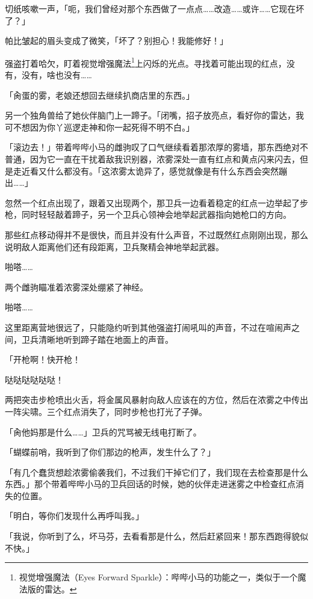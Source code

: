 切纸咳嗽一声，「呃，我们曾经对那个东西做了一点点……改造……或许……它现在坏了？」

帕比皱起的眉头变成了微笑，「坏了？别担心！我能修好！」

\horizonline


强盗打着哈欠，盯着视觉增强魔法\footnote{视觉增强魔法（Eyes Forward Sparkle）：哔哔小马的功能之一，类似于一个魔法版的雷达。}上闪烁的光点。寻找着可能出现的红点，没有，没有，啥也没有……

「肏蛋的雾，老娘还想回去继续扒商店里的东西。」

另一个独角兽给了她伙伴脑门上一蹄子。「闭嘴，招子放亮点，看好你的雷达，我可不想因为你丫巡逻走神和你一起死得不明不白。」

「滚边去！」带着哔哔小马的雌驹叹了口气继续看着那浓厚的雾墙，那东西绝对不普通，因为它一直在干扰着敌我识别器，浓雾深处一直有红点和黄点闪来闪去，但是走近看又什么都没有。「这浓雾太诡异了，感觉就像是有什么东西会突然蹦出……」

忽然一个红点出现了，跟着又出现两个，那卫兵一边看着稳定的红点一边举起了步枪，同时轻轻敲着蹄子，另一个卫兵心领神会地举起武器指向她枪口的方向。

那些红点移动得并不是很快，而且并没有什么声音，不过既然红点刚刚出现，那么说明敌人距离他们还有段距离，卫兵聚精会神地举起武器。

啪嗒……{}

两个雌驹瞄准着浓雾深处绷紧了神经。

啪嗒……{}

这里距离营地很远了，只能隐约听到其他强盗打闹吼叫的声音，不过在喧闹声之间，卫兵清晰地听到蹄子踏在地面上的声音。

「开枪啊！快开枪！

哒哒哒哒哒哒！

两把突击步枪喷出火舌，将金属风暴射向敌人应该在的方位，然后在浓雾之中传出一阵尖啸。三个红点消失了，同时步枪也打光了子弹。

「肏他妈那是什么……」卫兵的咒骂被无线电打断了。

「蝴蝶前哨，我听到了你们那边的枪声，发生什么了？」

「有几个蠢货想趁浓雾偷袭我们，不过我们干掉它们了，我们现在去检查那是什么东西。」那个带着哔哔小马的卫兵回话的时候，她的伙伴走进迷雾之中检查红点消失的位置。

「明白，等你们发现什么再呼叫我。」

「我说，你听到了么，坏马芬，去看看那是什么，然后赶紧回来！那东西跑得貌似不快。」

